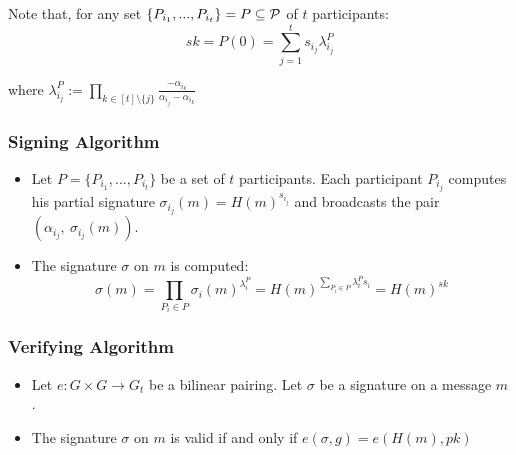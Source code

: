Note that, for any set $\{P_{i_1}, ... , P_{i_t} \} = P \subseteq {\mathcal P}$ of $t$ participants: $$sk = P(0) = \sum_{j = 1}^t s_{i_j} \lambda_{i_j}^P$$

where $\lambda_{i_j}^P := \prod_{k \in [t] \setminus \{j\}} \frac{-\alpha_{i_k}}{\alpha_{i_j} - \alpha_{i_k}}$

\subsubsection*{Signing Algorithm}
\begin{itemize}[align = left, leftmargin=*, label={--}]

\item Let $P = \{P_{i_1}, ..., P_{i_t} \}$ be a set of $t$ participants. Each participant $P_{i_j}$ computes his partial signature $\sigma_{i_j} (m) = H(m)^{s_{i_j}}$ and broadcasts the pair $(\alpha_{i_j}, \ \sigma_{i_j} (m))$.

\item The signature $\sigma$ on $m$ is computed: $$ \sigma (m) = \prod_{P_i \in P} \sigma_i (m)^{\lambda_i^{P}}= H(m)^{\sum_{P_i \in P} \lambda_i^P s_i} = H(m)^{sk}$$
\end{itemize}

\subsubsection*{Verifying Algorithm}
\begin{itemize}[align = left, leftmargin=*, label={--}]
\item Let $e: G \times G \rightarrow G_t$ be a bilinear pairing. Let $\sigma$ be a signature on a message $m$.
\item The signature $\sigma$ on $m$ is valid if and only if $e(\sigma, g) = e(H(m), pk)$
\end{itemize}